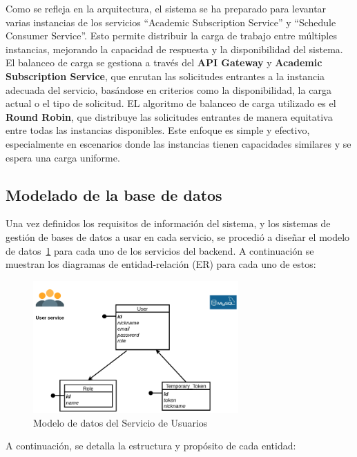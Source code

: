 Como se refleja en la arquitectura, el sistema se ha preparado para levantar varias instancias de los servicios ``Academic Subscription Service'' y ``Schedule Consumer Service''. Esto permite distribuir la carga de trabajo entre múltiples instancias, mejorando la capacidad de respuesta y la disponibilidad del sistema. El balanceo de carga se gestiona a través del \textbf{API Gateway} y \textbf{Academic Subscription Service}, que enrutan las solicitudes entrantes a la instancia adecuada del servicio, basándose en criterios como la disponibilidad, la carga actual o el tipo de solicitud.
\newline\newline
EL algoritmo de balanceo de carga utilizado es el \textbf{Round Robin}, que distribuye las solicitudes entrantes de manera equitativa entre todas las instancias disponibles. Este enfoque es simple y efectivo, especialmente en escenarios donde las instancias tienen capacidades similares y se espera una carga uniforme.

\subsection{Modelado de la base de datos}

Una vez definidos los requisitos de información del sistema, y los sistemas de gestión de bases de datos a usar en cada servicio, se procedió a diseñar el modelo de datos~\ref{fig:user_service_er} para cada uno de los servicios del backend. A continuación se muestran los diagramas de entidad-relación (ER) para cada uno de estos:

\begin{figure}[H]
    \centering
    \includegraphics[width=0.7\textwidth]{figures/06_user_db.png}
    \caption{Modelo de datos del Servicio de Usuarios}
    \label{fig:user_service_er}
\end{figure}

A continuación, se detalla la estructura y propósito de cada entidad:

